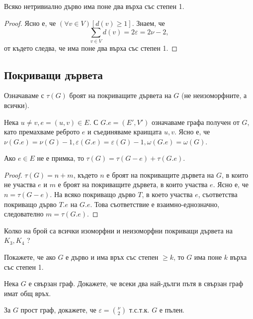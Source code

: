 \begin{crl}
  Всяко нетривиално дърво има поне два върха със степен 1.
\end{crl}
\begin{proof}
  Ясно е, че $(\forall v\in V)[d(v) \geq 1]$.
  Знаем, че \[\sum_{v\in V}d(v) = 2\varepsilon = 2\nu - 2,\] от където следва, че има поне два върха със степен 1.
\end{proof}



\subsection{Покриващи дървета}

Означаваме с $\tau(G)$ броят на покриващите дървета на $G$ (не неизоморфните, а всички).

Нека $u\neq v, e = (u,v)\in E$. С $G.e = (E',V')$ означаваме графа получен от $G$, като премахваме реброто $e$ и 
съединяваме краищата $u,v$. Ясно е, че $\nu(G.e) = \nu(G) - 1, \varepsilon(G.e) = \varepsilon(G) - 1, \omega(G.e) = \omega(G)$.

\begin{thm}
  Ако $e\in E$ не е примка, то
  $\tau(G) = \tau(G-e) + \tau(G.e)$.
\end{thm}
\begin{proof}
  $\tau(G) = n + m$, където $n$ е броят на покриващите дървета на $G$, в които не участва $e$
  и $m$ е броят на покриващите дървета, в които участва $e$.
  Ясно е, че $n = \tau(G-e)$.
  На всяко покриващо дърво $T$, в което участва $e$, съответства покриващо дърво $T.e$ на $G.e$.
  Това съответствие е взаимно-еднозначно, следователно $m = \tau(G.e)$.
\end{proof}

\begin{problem}
  Колко на брой са всички изоморфни и неизоморфни покриващи дървета на $K_3,K_4$ ?
\end{problem}


\begin{problem}
  Покажете, че ако $G$ е дърво и има връх със степен $\geq k$, то $G$ има поне $k$ върха със степен 1.
\end{problem}

\begin{problem}
  Нека $G$ е свързан граф.
  Докажете, че всеки два най-дълги пътя в свързан граф имат общ връх.
\end{problem}

\begin{problem}
  За $G$ прост граф, докажете, че $\varepsilon = \binom{\nu}{2}$ т.с.т.к. $G$ е пълен.
\end{problem}

